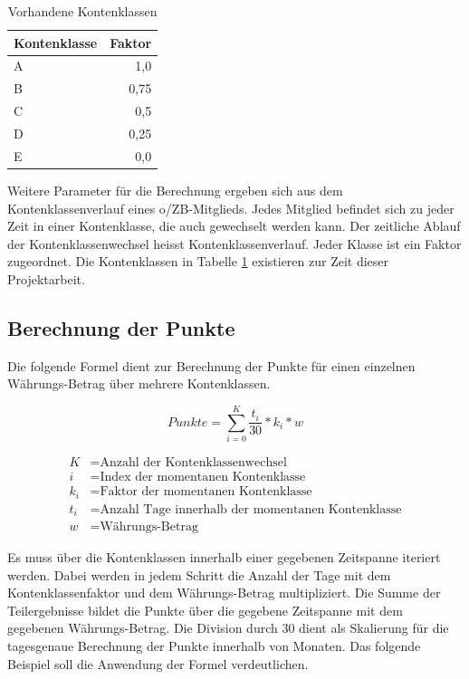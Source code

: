 \documentclass[12pt]{scrreprt}
\begin{document}
\begin{table}
  \begin{center}
    \begin{tabular}{|l|r|}
      \hline
      \textbf{Kontenklasse} & \textbf{Faktor}\\
      \hline
      A & 1,0\\
      \hline
      B & 0,75\\
      \hline
      C & 0,5\\
      \hline
      D & 0,25\\
      \hline
      E & 0,0\\
      \hline
    \end{tabular}
    \caption{Vorhandene Kontenklassen}
    \label{kkl}
  \end{center}
\end{table}
\vspace{2mm}

Weitere Parameter für die Berechnung ergeben sich aus dem Kontenklassenverlauf eines o/ZB-Mitglieds. Jedes Mitglied befindet sich zu jeder Zeit in einer Kontenklasse, die auch gewechselt werden kann. Der zeitliche Ablauf der Kontenklassenwechsel heisst Kontenklassenverlauf. Jeder Klasse ist ein Faktor zugeordnet. Die Kontenklassen in Tabelle \ref{kkl} existieren zur Zeit dieser Projektarbeit. \\

\subsection{Berechnung der Punkte}
Die folgende Formel dient zur Berechnung der Punkte für einen einzelnen Währungs-Betrag über mehrere Kontenklassen.

\begin{equation*}
  Punkte = \sum_{i=0}^{K} \frac{t_i}{30} * k_i * w
\end{equation*}

\begin{align*}
 K &= \text{Anzahl der Kontenklassenwechsel} \\
 i &= \text{Index der momentanen Kontenklasse} \\
 k_i &= \text{Faktor der momentanen Kontenklasse} \\
 t_i &= \text{Anzahl Tage innerhalb der momentanen Kontenklasse} \\
 w &= \text{Währungs-Betrag} 
\end{align*}

Es muss über die Kontenklassen innerhalb einer gegebenen Zeitspanne iteriert werden. Dabei werden in jedem Schritt die Anzahl der Tage mit dem Kontenklassenfaktor und dem Währungs-Betrag multipliziert. Die Summe der Teilergebnisse bildet die Punkte über die gegebene Zeitspanne mit dem gegebenen Währungs-Betrag. Die Division durch 30 dient als Skalierung für die tagesgenaue Berechnung der Punkte innerhalb von Monaten. Das folgende Beispiel soll die Anwendung der Formel verdeutlichen.
\end{document}
